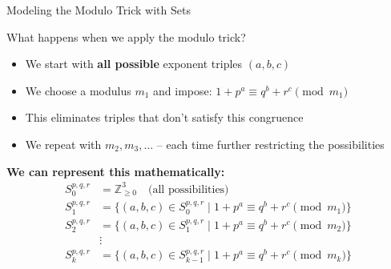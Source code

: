 \begin{frame}{Modeling the Modulo Trick with Sets}
    \begin{block}{What happens when we apply the modulo trick?}
        \begin{itemize}
            \item We start with \textbf{all possible} exponent triples $(a,b,c)$
            \item We choose a modulus $m_1$ and impose: $1+p^a \equiv q^b+r^c \pmod{m_1}$
            \item This eliminates triples that don't satisfy this congruence
            \item We repeat with $m_2, m_3, \dots$ -- each time further restricting the possibilities
        \end{itemize}
    \end{block}
    
    \vspace{0.3cm}
    \textbf{We can represent this mathematically:}
    \begin{align*}
        S_0^{p,q,r} &= \mathbb{Z}_{\geq 0}^3 \quad \text{(all possibilities)} \\
        S_1^{p,q,r} &= \{(a,b,c) \in S_0^{p,q,r} \; | \; 1+p^a \equiv q^b+r^c \pmod{m_1}\} \\
        S_2^{p,q,r} &= \{(a,b,c) \in S_1^{p,q,r} \; | \; 1+p^a \equiv q^b+r^c \pmod{m_2}\} \\
        &\vdots \\
        S_k^{p,q,r} &= \{(a,b,c) \in S_{k-1}^{p,q,r} \; | \; 1+p^a \equiv q^b+r^c \pmod{m_k}\}
    \end{align*}
\end{frame}

